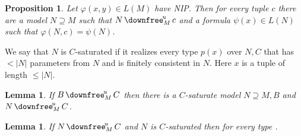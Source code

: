 \documentclass[10pt, oneside]{article}
\newcommand{\0}{\varnothing}
\renewcommand{\phi}{\varphi}
\newcounter{thm}
\theoremstyle{mio}
\newtheorem{proposition}[thm]{Proposition}
\newtheorem{lemma}[thm]{Lemma}
\def\nonfork{\mathop{\downfree}^{\!u\!}}
\begin{document}
\begin{proposition}
Let $\phi(x,y)\in L(M)$ have NIP. Then for every tuple $c$ there are a model $N\supseteq M$ such that $N\nonfork_M c$ and a formula $\psi(x)\in L(N)$ such that $\phi(N,c)=\psi(N)$.
\end{proposition}

We say that $N$ is $C$-saturated if it realizes every type $p(x)$ over $N,C$ that has $<|N|$ parameters from $N$ and is finitely consistent in $N$. Here $x$ is a tuple of length $\le |N|$.

\begin{lemma}
If $B\nonfork_M C$ then there is a $C$-saturate model $N\supseteq M,B$ and  $N\nonfork_M C$.
\end{lemma}

\begin{lemma}
If $N\nonfork_M C$ and $N$ is $C$-saturated then for every type .
\end{lemma}
\end{document}
